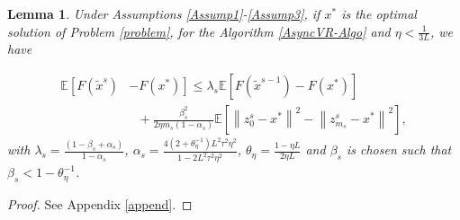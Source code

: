 \documentclass[conference]{IEEEtran}
\newcommand*{\E}{\mathbb{E}}
\newcommand{\norm}[1]{\left\lVert#1\right\rVert}
\newtheorem{lemma}[theorem]{Lemma}
\theoremstyle{definition}
\theoremstyle{remark}
\begin{document}
\begin{lemma}\label{lemma1}
Under Assumptions \ref{Assump1}-\ref{Assump3}, if $x^*$ is the optimal solution of Problem \eqref{problem}, for the Algorithm \ref{AsyncVR-Algo} and $\eta < \frac{1}{3L}$, we have 

\begin{equation}
\begin{split}
\E\left[ F(\widetilde{x}^s)\right. &-\left. F(x^*)\right]
\leq \lambda_s\E[F(\widetilde{x}^{s-1}) - F(x^*)]\\
&~~~+{\frac{\beta_s^2}{2\eta m_s(1-\alpha_s)}}\E[\norm{z_{0}^s-x^*}^2-\norm{z_{m_s}^s-x^*}^2 ],
\end{split}
\end{equation}
with $\lambda_s = \frac{(1-\beta_s+\alpha_s)}{1-\alpha_s}$, $\alpha_s=\frac{4(2+\theta_{\eta}^{-1})L^2\tau^2\eta^2}{1-2L^2 \tau^2\eta^2}$, $\theta_{\eta} = \frac{1-\eta L}{2\eta L}$ and $\beta_s$ is chosen such that $\beta_s < 1-\theta_{\eta}^{-1}$.
\end{lemma}
\begin{proof}
See Appendix \ref{append}.
\end{proof}
\end{document}
